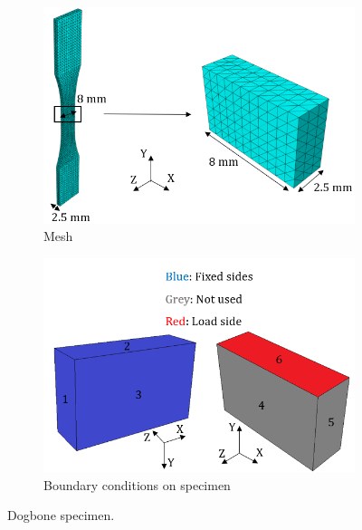 \documentclass[11pt,a4paper]{article}
\begin{document}
\begin{figure} [ht]
\begin{subfigure}{0.5\textwidth}
\includegraphics[scale=0.65, center]{specimen.png}
\caption{Mesh}
\label{ful_specimen}
\end{subfigure}
\begin{subfigure}{0.5\textwidth}
\vspace{-3mm}
\includegraphics[scale=0.65, center]{BCs.png}
\vspace{0mm}
\caption{Boundary conditions on specimen}
\label{center_only_mesh}
\end{subfigure}
\caption{Dogbone specimen.}
\label{mesh normal}
\end{figure}
\end{document}
